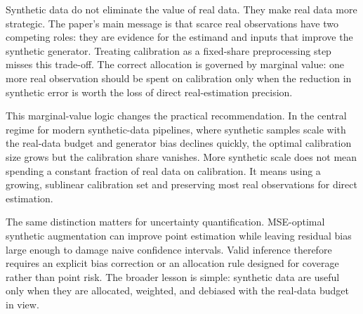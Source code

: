 \label{sec:discussion}

Synthetic data do not eliminate the value of real data. They make real data more strategic. The paper's main message is that scarce real observations have two competing roles: they are evidence for the estimand and inputs that improve the synthetic generator. Treating calibration as a fixed-share preprocessing step misses this trade-off. The correct allocation is governed by marginal value: one more real observation should be spent on calibration only when the reduction in synthetic error is worth the loss of direct real-estimation precision.

This marginal-value logic changes the practical recommendation. In the central regime for modern synthetic-data pipelines, where synthetic samples scale with the real-data budget and generator bias declines quickly, the optimal calibration size grows but the calibration share vanishes. More synthetic scale does not mean spending a constant fraction of real data on calibration. It means using a growing, sublinear calibration set and preserving most real observations for direct estimation.

The same distinction matters for uncertainty quantification. MSE-optimal synthetic augmentation can improve point estimation while leaving residual bias large enough to damage naive confidence intervals. Valid inference therefore requires an explicit bias correction or an allocation rule designed for coverage rather than point risk. The broader lesson is simple: synthetic data are useful only when they are allocated, weighted, and debiased with the real-data budget in view.
